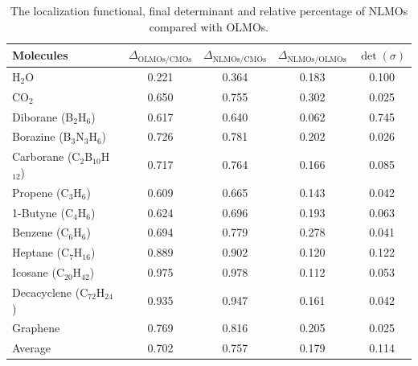 \documentclass[aps,prl,reprint,amsmath,amssymb]{revtex4-1}
\begin{document}


\begin{table}[tb]
\caption{The localization functional, final determinant and relative percentage of NLMOs compared with OLMOs.}
\label{tab:loc}
\centering
\begin{tabular}{l c c c c}
\hline\hline
Molecules & $\Delta_{\text{OLMOs/CMOs}}$  & $\Delta_{\text{NLMOs/CMOs}}$ & $\Delta_{\text{NLMOs/OLMOs}}$ & $\det(\sigma)$ \\
\hline
H$_2$O & 0.221 & 0.364 & 0.183 & 0.100 \\ 
CO$_2$ & 0.650 & 0.755 & 0.302 & 0.025 \\
Diborane (B$_2$H$_6$) & 0.617 & 0.640 & 0.062 & 0.745 \\
Borazine (B$_3$N$_3$H$_6$) & 0.726 & 0.781 & 0.202 & 0.026 \\
Carborane (C$_2$B$_{10}$H$_{12}$) & 0.717 & 0.764 & 0.166 & 0.085 \\ 
Propene (C$_3$H$_6$) & 0.609 & 0.665 & 0.143 & 0.042 \\
1-Butyne (C$_4$H$_6$) & 0.624 & 0.696 & 0.193 & 0.063 \\
Benzene (C$_6$H$_6$) & 0.694 & 0.779 & 0.278 & 0.041 \\ 
Heptane (C$_7$H$_{16}$) & 0.889 & 0.902 & 0.120 & 0.122 \\ 
Icosane (C$_{20}$H$_{42}$) & 0.975 & 0.978 & 0.112 & 0.053 \\ 
Decacyclene (C$_{72}$H$_{24}$) & 0.935 & 0.947 & 0.161 & 0.042 \\ 
Graphene & 0.769 & 0.816 & 0.205 & 0.025 \\
\hline
Average & 0.702 & 0.757 & 0.179 & 0.114 \\
\hline
\hline
\end{tabular}
\label{table:nonlin}
\end{table}

\end{document}
